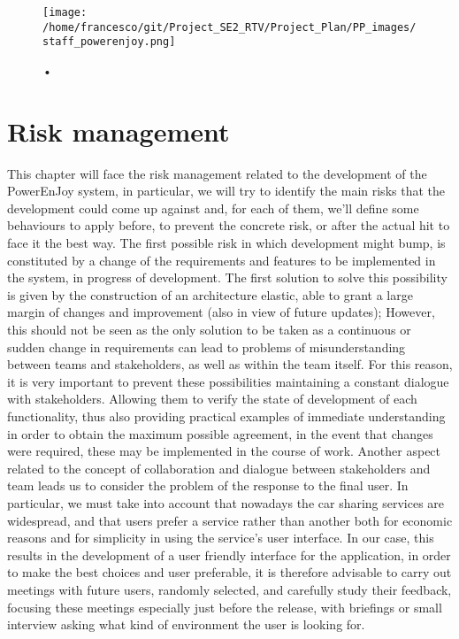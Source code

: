 \documentclass[10pt, a4paper,titlepage]{article}
\begin{document}
\begin{figure}[h]
\begin{center}
\texttt{[image: /home/francesco/git/Project\_SE2\_RTV/Project\_Plan/PP\_images/staff\_powerenjoy.png]}
\label{fig:RES}
\end{center}•
\end{figure}
\clearpage
\section{Risk management}
This chapter will face the risk management related to the development of the PowerEnJoy system, in particular, we will try to identify the main risks that the development could come up against and, for each of them, we’ll define some behaviours to apply before, to prevent the concrete risk, or after the actual hit to face it the best way.
The first possible risk in which development might bump, is constituted by a change of the requirements and features to be implemented in the system, in progress of development. The first solution to solve this possibility is given by the construction of an architecture elastic, able to grant a large margin of changes and improvement (also in view of future updates); However, this should not be seen as the only solution to be taken as a continuous or sudden change in requirements can lead to problems of misunderstanding between teams and stakeholders, as well as within the team itself.
For this reason, it is very important to prevent these possibilities maintaining a constant dialogue with stakeholders. Allowing them to verify the state of development of each functionality, thus also providing practical examples of immediate understanding in order to obtain the maximum possible agreement, in the event that changes were required, these may be implemented in the course of work.
Another aspect related to the concept of collaboration and dialogue between stakeholders and team leads us to consider the problem of the response to the final user.
In particular, we must take into account that nowadays the car sharing services are widespread, and that users prefer a service rather than another both for economic reasons and for simplicity in using the service’s user interface. In our case, this results in the development of a user friendly interface for the application, in order to make the best choices and user preferable, it is therefore advisable to carry out meetings with future users, randomly selected, and carefully study their feedback, focusing these meetings especially just before the release, with briefings or small interview asking what kind of environment the user is looking for.
\end{document}
